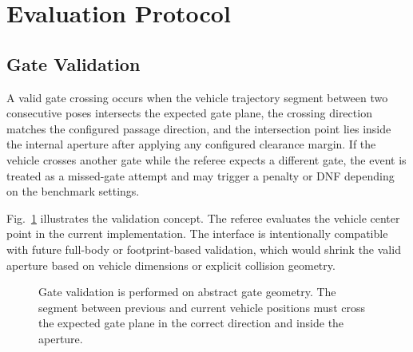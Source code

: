 \section{Evaluation Protocol}

\subsection{Gate Validation}

A valid gate crossing occurs when the vehicle trajectory segment between two consecutive poses intersects the expected gate plane, the crossing direction matches the configured passage direction, and the intersection point lies inside the internal aperture after applying any configured clearance margin. If the vehicle crosses another gate while the referee expects a different gate, the event is treated as a missed-gate attempt and may trigger a penalty or DNF depending on the benchmark settings.

Fig.~\ref{fig:gate_validation} illustrates the validation concept. The referee evaluates the vehicle center point in the current implementation. The interface is intentionally compatible with future full-body or footprint-based validation, which would shrink the valid aperture based on vehicle dimensions or explicit collision geometry.

\begin{figure}[t]
\centering
{}
\caption{Gate validation is performed on abstract gate geometry. The segment between previous and current vehicle positions must cross the expected gate plane in the correct direction and inside the aperture.}
\label{fig:gate_validation}
\end{figure}

